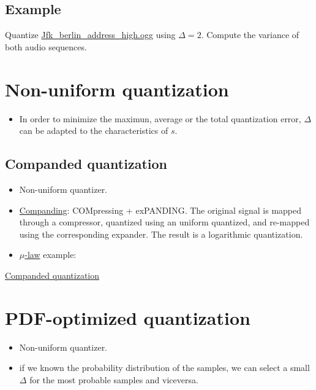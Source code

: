 \subsection{Example}
Quantize
\href{https://upload.wikimedia.org/wikipedia/commons/3/3a/Jfk_berlin_address_high.ogg}{Jfk\_berlin\_address\_high.ogg}
using \(\Delta=2\). Compute the variance of both audio sequences.

\section{Non-uniform quantization}
\begin{itemize}
\tightlist
\item
  In order to minimize the maximun, average or the total quantization
  error, \(\Delta\) can be adapted to the characteristics of \(s\).
\end{itemize}

\subsection{Companded quantization}
\begin{itemize}
\item
  Non-uniform quantizer.
\item
  \href{https://en.wikipedia.org/wiki/Companding}{Companding}:
  COMpressing + exPANDING. The original signal is mapped through a
  compressor, quantized using an uniform quantized, and re-mapped using
  the corresponding expander. The result is a logarithmic quantization.
\item
  \href{https://en.wikipedia.org/wiki/\%CE\%9C-law_algorithm}{\(\mu\)-law}
  example:
\end{itemize}

\href{https://nbviewer.jupyter.org/github/vicente-gonzalez-ruiz/LZW/blob/master/companded_quantization.ipynb}{Companded quantization}


\section{PDF-optimized quantization}
\begin{itemize}
\item
  Non-uniform quantizer.
\item
  if we known the probability distribution of the samples, we can select
  a small \(\Delta\) for the most probable samples and viceversa.
\end{itemize}

